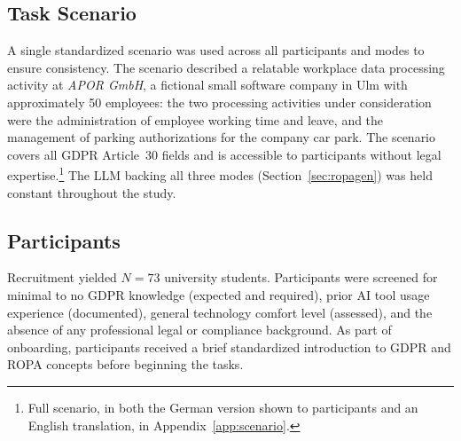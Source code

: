 \subsection{Task Scenario}

A single standardized scenario was used across all participants and modes to ensure consistency. The scenario described a relatable workplace data processing activity at \emph{APOR GmbH}, a fictional small software company in Ulm with approximately 50 employees: the two processing activities under consideration were the administration of employee working time and leave, and the management of parking authorizations for the company car park. The scenario covers all GDPR Article~30 fields and is accessible to participants without legal expertise.\footnote{Full scenario, in both the German version shown to participants and an English translation, in Appendix~\ref{app:scenario}.} The LLM backing all three modes (Section~\ref{sec:ropagen}) was held constant throughout the study.

\subsection{Participants}

Recruitment yielded $N=73$ university students. Participants were screened for minimal to no GDPR knowledge (expected and required), prior AI tool usage experience (documented), general technology comfort level (assessed), and the absence of any professional legal or compliance background. As part of onboarding, participants received a brief standardized introduction to GDPR and ROPA concepts before beginning the tasks.

